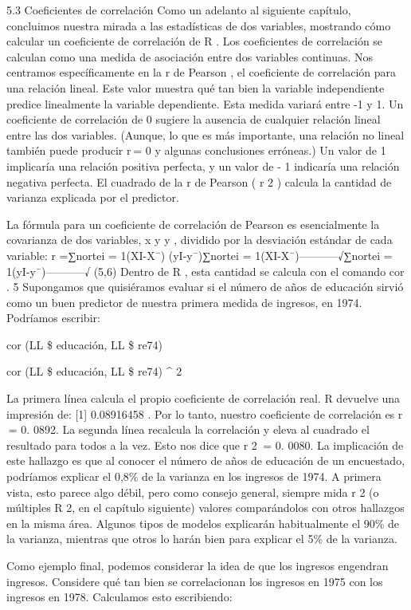 \documentclass[
]{book}
\begin{document}
5.3 Coeficientes de correlación
Como un adelanto al siguiente capítulo, concluimos nuestra mirada a las estadísticas de dos variables, mostrando cómo calcular un coeficiente de correlación de R . Los coeficientes de correlación se calculan como una medida de asociación entre dos variables continuas. Nos centramos específicamente en la r de Pearson , el coeficiente de correlación para una relación lineal. Este valor muestra qué tan bien la variable independiente predice linealmente la variable dependiente. Esta medida variará entre -1 y 1. Un coeficiente de correlación de 0 sugiere la ausencia de cualquier relación lineal entre las dos variables. (Aunque, lo que es más importante, una relación no lineal también puede producir r = 0 y algunas conclusiones erróneas.) Un valor de 1 implicaría una relación positiva perfecta, y un valor de - 1 indicaría una relación negativa perfecta. El cuadrado de la r de Pearson ( r 2 ) calcula la cantidad de varianza explicada por el predictor.

La fórmula para un coeficiente de correlación de Pearson es esencialmente la covarianza de dos variables, x y y , dividido por la desviación estándar de cada variable:
r =∑nortei = 1(XI-X¯) (yI-y¯)∑nortei = 1(XI-X¯)-----------√∑nortei = 1(yI-y¯)-----------√
(5,6)
Dentro de R , esta cantidad se calcula con el comando cor . 5
Supongamos que quisiéramos evaluar si el número de años de educación sirvió como un buen predictor de nuestra primera medida de ingresos, en 1974. Podríamos escribir:

cor (LL \$ educación, LL \$ re74)

cor (LL \$ educación, LL \$ re74) \^{} 2

La primera línea calcula el propio coeficiente de correlación real. R devuelve una impresión de: {[}1{]} 0.08916458 . Por lo tanto, nuestro coeficiente de correlación es r  = 0. 0892. La segunda línea recalcula la correlación y eleva al cuadrado el resultado para todos a la vez. Esto nos dice que r 2  = 0. 0080. La implicación de este hallazgo es que al conocer el número de años de educación de un encuestado, podríamos explicar el 0,8\% de la varianza en los ingresos de 1974. A primera vista, esto parece algo débil, pero como consejo general, siempre mida r 2 (o múltiples R 2, en el capítulo siguiente) valores comparándolos con otros hallazgos en la misma área. Algunos tipos de modelos explicarán habitualmente el 90\% de la varianza, mientras que otros lo harán bien para explicar el 5\% de la varianza.

Como ejemplo final, podemos considerar la idea de que los ingresos engendran ingresos. Considere qué tan bien se correlacionan los ingresos en 1975 con los ingresos en 1978. Calculamos esto escribiendo:
\end{document}
